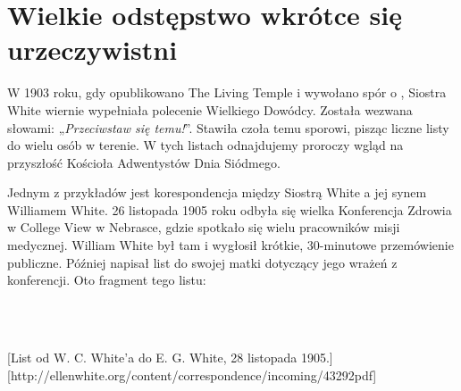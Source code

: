 \chapter{Wielkie odstępstwo wkrótce się urzeczywistni} \label{chap:apostasy}

W 1903 roku, gdy opublikowano The Living Temple i wywołano spór o , Siostra White wiernie wypełniała polecenie Wielkiego Dowódcy. Została wezwana słowami: „\textit{Przeciwstaw się temu!}”. Stawiła czoła temu sporowi, pisząc liczne listy do wielu osób w terenie. W tych listach odnajdujemy proroczy wgląd na przyszłość Kościoła Adwentystów Dnia Siódmego.

Jednym z przykładów jest korespondencja między Siostrą White a jej synem Williamem White. 26 listopada 1905 roku odbyła się wielka Konferencja Zdrowia w College View w Nebrasce, gdzie spotkało się wielu pracowników misji medycznej. William White był tam i wygłosił krótkie, 30-minutowe przemówienie publiczne. Później napisał list do swojej matki dotyczący jego wrażeń z konferencji. Oto fragment tego listu:

 \\
 \\

[List od W. C. White'a do E. G. White, 28 listopada 1905.][http://ellenwhite.org/content/correspondence/incoming/43292pdf]

